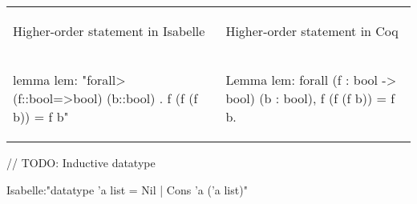 \documentclass[article]{aaltoseries}
\begin{document}
\begin{tabular}{p{.45\linewidth} p{.45\linewidth}}
\begin{center}Higher-order statement in Isabelle\end{center}  &  \begin{center}Higher-order statement in Coq\end{center} \\
\begin{isabelle}
lemma lem:
"\<forall> (f::bool=>bool) (b::bool) .
    f (f (f b)) = f b"
\end{isabelle}
&
\begin{coq}
Lemma lem: 
forall (f : bool -> bool) (b : bool),
    f (f (f b)) = f b.
\end{coq}


\end{tabular}

// TODO: Inductive datatype

Isabelle:"datatype ’a list = Nil | Cons ’a (’a list)" %
\end{document}
